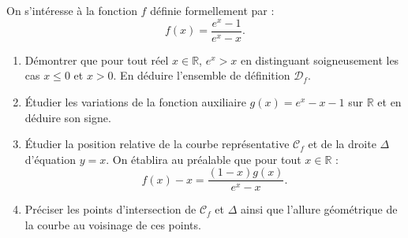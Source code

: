 \documentclass[11pt,a4paper]{article}
\newcommand{\R}{\mathbb{R}}
\begin{document}
On s'intéresse à la fonction $f$ définie formellement par :
\[
f(x) = \frac{e^x - 1}{e^x - x}.
\]
\begin{enumerate}[label=\textbf{\arabic*.}]
    \item Démontrer que pour tout réel $x \in \R$, $e^x > x$ en distinguant soigneusement les cas $x \le 0$ et $x > 0$. En déduire l'ensemble de définition $\mathcal{D}_f$.
    \item Étudier les variations de la fonction auxiliaire $g(x) = e^x - x - 1$ sur $\R$ et en déduire son signe.
    \item Étudier la position relative de la courbe représentative $\mathcal{C}_f$ et de la droite $\Delta$ d'équation $y = x$. On établira au préalable que pour tout $x \in \R$ :
    \[
    f(x) - x = \frac{(1 - x)g(x)}{e^x - x}.
    \]
    \item Préciser les points d'intersection de $\mathcal{C}_f$ et $\Delta$ ainsi que l'allure géométrique de la courbe au voisinage de ces points.
\end{enumerate}
\end{document}
